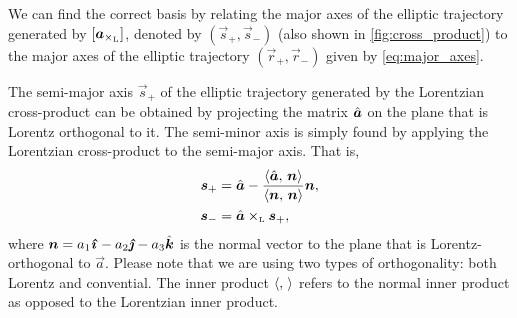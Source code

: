 We can find the correct basis by relating the major axes of the elliptic trajectory generated by $ [\vec{a}_{\lorcrossp{}{}}] $, denoted by $(\vec{s}_+, \vec{s}_-)$ (also shown in \cref{fig:cross_product})
to the major axes of the elliptic trajectory $(\vec{r}_+, \vec{r}_-)$ given by \cref{eq:major_axes}. 

The semi-major axis $\vec{s}_+$ of the elliptic trajectory generated by the Lorentzian cross-product can be obtained by projecting the matrix $\uvec{a}$ on the plane that is Lorentz orthogonal to it. The semi-minor axis is simply found by applying the Lorentzian cross-product to the semi-major axis. That is,
\begin{equation}
    \begin{split}
        \vec{s}_+ &= \uvec{a} - \frac{ \inner{\uvec{a}}{\vec{n}} }{ \inner{\vec{n}}{\vec{n}} } \vec{n}, \\
        \vec{s}_- &= \lorcrossp{\uvec{a}}{\vec{s}_+}, \\
    \end{split}
\end{equation}
where $\vec{n} = a_1\quati - a_2\quatj - a_3\quatk$ is the normal vector to the plane that is Lorentz-orthogonal to $\vec{a}$. Please note that we are using two types of orthogonality: both Lorentz and convential. The inner product $\langle ,\, \rangle$ refers to the normal inner product as opposed to the Lorentzian inner product.

